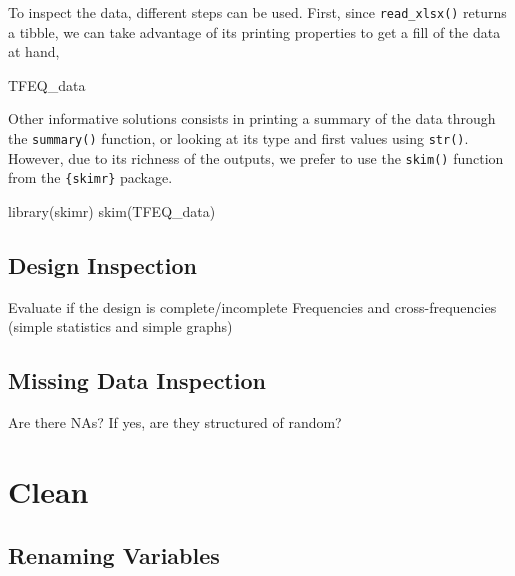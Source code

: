 \documentclass[
]{book}
\newenvironment{Shaded}{\begin{snugshade}}{\end{snugshade}}
\newcommand{\FunctionTok}[1]{\textcolor[rgb]{0.00,0.00,0.00}{#1}}
\newcommand{\NormalTok}[1]{#1}
\begin{document}
To inspect the data, different steps can be used.
First, since \texttt{read\_xlsx()} returns a tibble, we can take advantage of its printing properties to get a fill of the data at hand,

\begin{Shaded}
\begin{Highlighting}[]
\NormalTok{TFEQ\_data}
\end{Highlighting}
\end{Shaded}

Other informative solutions consists in printing a summary of the data through the \texttt{summary()} function, or looking at its type and first values using \texttt{str()}. However, due to its richness of the outputs, we prefer to use the \texttt{skim()} function from the \texttt{\{skimr\}} package.

\begin{Shaded}
\begin{Highlighting}[]
\FunctionTok{library}\NormalTok{(skimr)}
\FunctionTok{skim}\NormalTok{(TFEQ\_data)}
\end{Highlighting}
\end{Shaded}

\hypertarget{design-inspection}{%
\subsection{Design Inspection}\label{design-inspection}}

Evaluate if the design is complete/incomplete
Frequencies and cross-frequencies (simple statistics and simple graphs)

\hypertarget{missing-data-inspection}{%
\subsection{Missing Data Inspection}\label{missing-data-inspection}}

Are there NAs?
If yes, are they structured of random?

\hypertarget{clean-1}{%
\section{Clean}\label{clean-1}}

\hypertarget{renaming-variables}{%
\subsection{Renaming Variables}\label{renaming-variables}}
\end{document}
